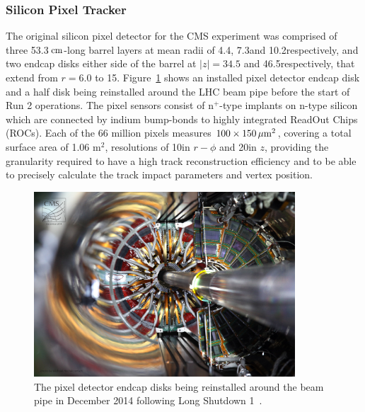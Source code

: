 

\subsubsection{Silicon Pixel Tracker}
The original silicon pixel detector for the CMS experiment was comprised of three 53.3$\,\text{cm}$-long barrel layers at mean radii of 4.4\cm, 7.3\cm and 10.2\cm respectively, and two endcap disks either side of the barrel at $|z| = 34.5$ and 46.5\cm respectively, that extend from $r = 6.0$ to 15\cm.
Figure~\ref{fig:pixel} shows an installed pixel detector endcap disk and a half disk being reinstalled around the LHC beam pipe before the start of Run 2 operations.
The pixel sensors consist of n$^{+}$-type implants on n-type silicon which are connected by indium bump-bonds to highly integrated ReadOut Chips (ROCs).
Each of the 66 million pixels measures $100 \times 150\,\mu\text{m}^{2}$, covering a total surface area of 1.06 m$^{2}$, resolutions of 10\mum in $r-\phi$ and 20\mum in $z$, providing the granularity required to have a high track reconstruction efficiency and to be able to precisely calculate the track impact parameters and vertex position.

\begin{figure}[htbp]
\begin{center}
\vspace*{2mm}\includegraphics[width=0.87\textwidth]{figs/cms/a194Ts.jpg}
\vspace*{1mm}\caption{The pixel detector endcap disks being reinstalled around the beam pipe in December 2014 following Long Shutdown 1~\cite{Hoch:1977415}.}
\label{fig:pixel}
\end{center}
\end{figure}


